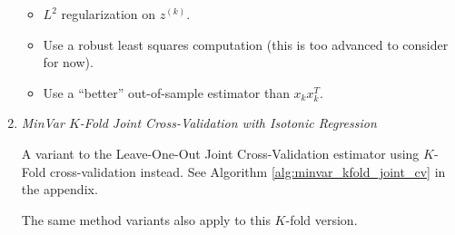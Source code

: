 \documentclass{article}
\begin{document}
\begin{enumerate}
\begin{itemize}
	\item $L^2$ regularization on $z^{(k)}$.

	\item Use a robust least squares computation (this is too advanced to consider
	for now).
	
	\item Use a ``better'' out-of-sample estimator than $x_k x_k^T$.

\end{itemize}




\item \emph{MinVar $K$-Fold Joint Cross-Validation with Isotonic Regression}

A variant to the Leave-One-Out Joint Cross-Validation estimator using $K$-Fold
cross-validation instead.  See Algorithm \ref{alg:minvar_kfold_joint_cv} in the
appendix.

The same method variants also apply to this $K$-fold version.

\end{enumerate}





\end{document}
